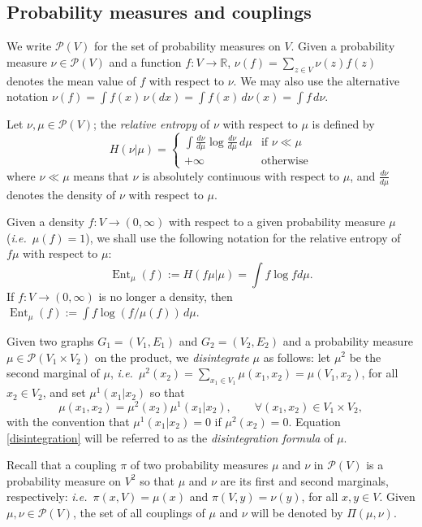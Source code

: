 \documentclass[11pt]{amsart}
\numberwithin{equation}{section}
\begin{document}
\subsection*{Probability measures and couplings}

We write ${\mathcal P}(V)$ for the set of probability measures on $V$. Given a probability measure $\nu \in {\mathcal P}(V)$ and a function $f \colon V \to {\mathbb{R}} $,  $\nu(f)=\sum_{z \in V} \nu(z)f(z)$ denotes the mean value of $f$ with respect to $\nu$. We may also use the alternative notation $\nu(f)=\int f(x) \,\nu(dx) = \int f(x)\,d\nu(x)=\int f\,d\nu$. 

Let $\nu,\mu\in \mathcal{P}(V)$; the \emph{relative entropy} of $\nu$ with respect to $\mu$ is defined by
$$
H(\nu|\mu)= 
\begin{cases}
\int \frac{d\nu}{d\mu} \log \frac{d\nu}{d\mu} \,d\mu& \mbox{if } \nu \ll \mu \\
+\infty & \mbox{otherwise} 
\end{cases}
$$
where $\nu \ll \mu$ means that $\nu$ is absolutely continuous with respect to $\mu$, and $\frac{d\nu}{d\mu}$
denotes the density of $\nu$ with respect to $\mu$.

Given a density $f \colon V \to (0,\infty)$ with respect to a given probability measure $\mu$ (\textit{i.e.}\ $\mu(f)=1$),
we shall use the following notation for the relative entropy of $f\mu$ with respect to $\mu$:
$$
{\operatorname{Ent}}_\mu(f) := H(f\mu |\mu) = \int f \log f d\mu .
$$
If $f\colon V \to (0,\infty)$  is no longer a density, then  ${\operatorname{Ent}}_\mu(f) := \int f \log (f/\mu(f))\,d\mu$.

Given two graphs $G_1=(V_1,E_1)$ and $G_2=(V_2,E_2)$ and a probability measure $\mu \in \mathcal{P}(V_1 \times V_2)$ on the product,
we \emph{disintegrate} $\mu$ as follows: let $\mu^2$ be the second marginal of $\mu$, \textit{i.e.}\ $\mu^2(x_2)=\sum_{x_1 \in V_1} \mu(x_1,x_2)=\mu(V_1,x_2)$, for all $x_2 \in V_2$, and set $\mu^1(x_1|x_2)$ so that
\begin{equation} \label{disintegration}
\mu(x_1,x_2)=\mu^2(x_2) \mu^1(x_1 |x_2), \qquad \forall (x_1,x_2) \in V_1 \times V_2,
\end{equation}
with the convention that $\mu^1(x_1|x_2)=0$ if $\mu^2(x_2)=0$. Equation \eqref{disintegration} will be referred to as the \emph{disintegration formula} of $\mu$.

Recall that a coupling $\pi$ of two probability measures $\mu$ and $\nu$ in $\mathcal{P}(V)$ is a probability measure on $V^2$ so that $\mu$ and $\nu$ are its first and second marginals, respectively: \textit{i.e.}\ $\pi(x,V)=\mu(x)$ and $\pi(V,y)=\nu(y)$, for all $x, y \in V$.
Given $\mu, \nu \in \mathcal{P}(V)$, the set of all couplings of $\mu$ and $\nu$ will be denoted by $\Pi(\mu,\nu)$.
\end{document}
